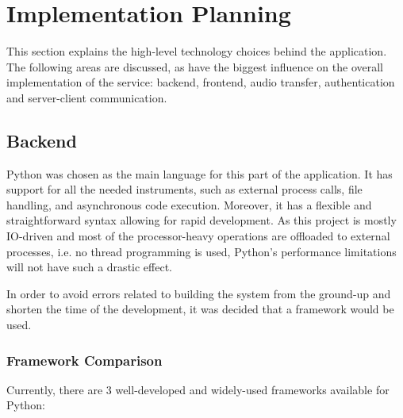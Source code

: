 \chapter{Implementation Planning}\label{ch:planning}

This section explains the high-level technology choices behind the application.
The following areas are discussed, as have the biggest influence on the overall implementation of the service:
backend, frontend, audio transfer, authentication and server-client communication.


\section{Backend}
Python\cite{python} was chosen as the main language for this part of the application.
It has support for all the needed instruments, such as external process calls,
file handling, and asynchronous code execution. Moreover, it has a flexible and straightforward
syntax allowing for rapid development.
As this project is mostly IO-driven and most of the processor-heavy operations are offloaded to external processes,
i.e. no thread programming is used, Python's performance limitations\cite{gil} will not have such a drastic effect.

In order to avoid errors related to building the system from the ground-up
and shorten the time of the development, it was decided that a framework would be used.

\subsection{Framework Comparison}
Currently, there are 3 well-developed and widely-used frameworks available for Python:

